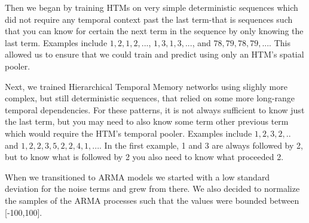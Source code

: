 \documentclass[oneside,12pt,openany]{book}
\begin{document}
	Then we began by training HTMs on very simple deterministic sequences which did not require any temporal context past the last term-that is sequences such that you can know for certain the next term in the sequence by only knowing the last term. Examples include $1,2,1,2,...$, $1,3,1,3,...$, and $78,79,78,79,...$. This allowed us to ensure that we could train and predict using only an HTM's spatial pooler.

	Next, we trained Hierarchical Temporal Memory networks using slighly more complex, but still deterministic sequences, that relied on some more long-range temporal dependencies. For these patterns, it is not always sufficient to know just the last term, but you may need to also know some term other previous term which would require the HTM's temporal pooler. Examples include $1,2,3,2,..$ and $1,2,2,3,5,2,2,4,1,...$. In the first example, 1 and 3 are always followed by 2, but to know what is followed by 2 you also need to know what proceeded 2.

	When we transitioned to ARMA models we started with a low standard deviation for the noise terms and grew from there. We also decided to normalize the samples of the ARMA processes such that the values were bounded between [-100,100].
	
\end{document}
